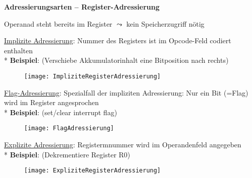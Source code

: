\textbf{Adressierungsarten -- Register-Adressierung}
\begin{items}
	\item Operanad steht bereits im Register $\leadsto$ kein Speicherzugriff nötig
	\item \underline{Implizite Adressierung}: Nummer des Registers ist im Opcode-Feld codiert enthalten \\* \textbf{Beispiel}:  (Verschiebe Akkumulatorinhalt eine Bitposition nach rechts)
		\begin{figure}[ht]
		  \centering
		  \texttt{[image: ImpliziteRegisterAdressierung]}
		  \label{ImpliziteRegisterAdressierung}
		\end{figure}
	\item \underline{Flag-Adressierung}: Spezialfall der impliziten Adressierung: Nur ein Bit (=Flag) wird im Register angesprochen \\* \textbf{Beispiel}:  (set/clear interrupt flag)
		\begin{figure}[ht]
		  \centering
		  \texttt{[image: FlagAdressierung]}
		  \label{FlagAdressierung}
		\end{figure}
	\item \underline{Explizite Adressierung}: Registermnummer wird im Operandenfeld angegeben \\* \textbf{Beispiel}:  (Dekrementiere Register R0)
		\begin{figure}[ht]
		  \centering
		  \texttt{[image: ExpliziteRegisterAdressierung]}
		  \label{ExpliziteRegisterAdressierung}
		\end{figure}
\end{items}


